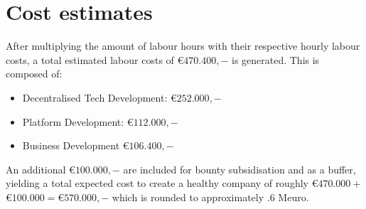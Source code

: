 \section{Cost estimates}
After multiplying the amount of labour hours with their respective hourly labour costs, a total estimated labour costs of \euro$470.400,-$ is generated. This is composed of:
\begin{itemize}
	\item Decentralised Tech Development: \euro$252.000,-$ 
	\item Platform Development: \euro$112.000,-$ 
	\item Business Development \euro$106.400,-$ 
\end{itemize}
An additional \euro$100.000,-$ are included for bounty subsidisation and as a buffer, yielding a total expected cost to create a healthy company of roughly \euro$470.000+$\euro$100.000=$\euro$570.000,-$ which is rounded to approximately .6 Meuro.